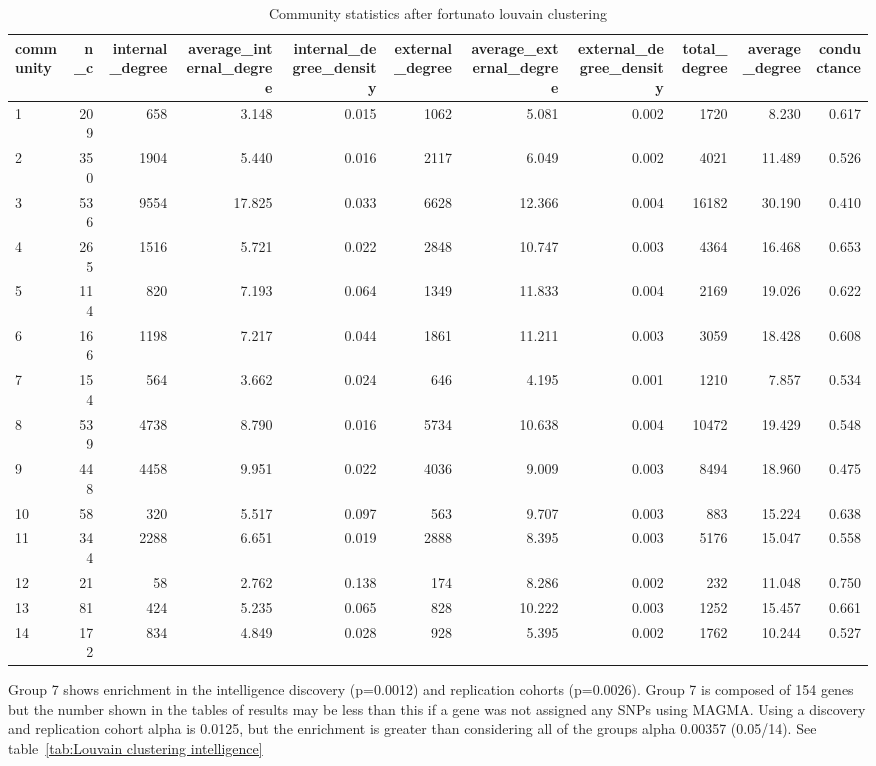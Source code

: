 \begin{table}[ht]
\centering
\begin{adjustbox}{max width=\textwidth}
\begin{tabular}{lrrrrrrrrrr}
  \hline
community & n\_c & internal\_degree & average\_internal\_degree & internal\_degree\_density & external\_degree & average\_external\_degree & external\_degree\_density & total\_degree & average\_degree & conductance \\ 
  \hline
1 & 209 & 658 & 3.148 & 0.015 & 1062 & 5.081 & 0.002 & 1720 & 8.230 & 0.617 \\ 
  2 & 350 & 1904 & 5.440 & 0.016 & 2117 & 6.049 & 0.002 & 4021 & 11.489 & 0.526 \\ 
  3 & 536 & 9554 & 17.825 & 0.033 & 6628 & 12.366 & 0.004 & 16182 & 30.190 & 0.410 \\ 
  4 & 265 & 1516 & 5.721 & 0.022 & 2848 & 10.747 & 0.003 & 4364 & 16.468 & 0.653 \\ 
  5 & 114 & 820 & 7.193 & 0.064 & 1349 & 11.833 & 0.004 & 2169 & 19.026 & 0.622 \\ 
  6 & 166 & 1198 & 7.217 & 0.044 & 1861 & 11.211 & 0.003 & 3059 & 18.428 & 0.608 \\ 
  7 & 154 & 564 & 3.662 & 0.024 & 646 & 4.195 & 0.001 & 1210 & 7.857 & 0.534 \\ 
  8 & 539 & 4738 & 8.790 & 0.016 & 5734 & 10.638 & 0.004 & 10472 & 19.429 & 0.548 \\ 
  9 & 448 & 4458 & 9.951 & 0.022 & 4036 & 9.009 & 0.003 & 8494 & 18.960 & 0.475 \\ 
  10 & 58 & 320 & 5.517 & 0.097 & 563 & 9.707 & 0.003 & 883 & 15.224 & 0.638 \\ 
  11 & 344 & 2288 & 6.651 & 0.019 & 2888 & 8.395 & 0.003 & 5176 & 15.047 & 0.558 \\ 
  12 & 21 & 58 & 2.762 & 0.138 & 174 & 8.286 & 0.002 & 232 & 11.048 & 0.750 \\ 
  13 & 81 & 424 & 5.235 & 0.065 & 828 & 10.222 & 0.003 & 1252 & 15.457 & 0.661 \\ 
  14 & 172 & 834 & 4.849 & 0.028 & 928 & 5.395 & 0.002 & 1762 & 10.244 & 0.527 \\ 
   \hline
\end{tabular}
\end{adjustbox}
\caption{Community statistics after fortunato louvain clustering} 
\label{tab:Community statistics after fortunato louvain clustering}
\end{table}

Group 7 shows enrichment in the intelligence discovery (p=0.0012) and replication cohorts (p=0.0026). Group 7 is composed of 154 genes but the number shown in the tables of results may be less than this if a gene was not assigned any SNPs using MAGMA. Using a discovery and replication cohort alpha is 0.0125, but the enrichment is greater than considering all of the groups alpha 0.00357 (0.05/14). See table~\ref{tab:Louvain clustering intelligence}


